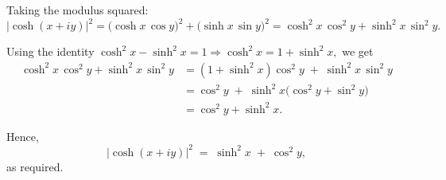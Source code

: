 \documentclass[12pt]{article}
\theoremstyle{definition} %
\theoremstyle{plain} %
\begin{document}
Taking the modulus squared:
\[
|\cosh(x + i y)|^2 
= \bigl(\cosh x \,\cos y\bigr)^2 + \bigl(\sinh x \,\sin y\bigr)^2 
= \cosh^2 x\,\cos^2 y + \sinh^2 x\,\sin^2 y.
\]

Using the identity \(\cosh^2 x - \sinh^2 x = 1 \Rightarrow \cosh^2 x = 1 + \sinh^2 x,\) we get
\begin{align*}
\cosh^2 x\,\cos^2 y + \sinh^2 x\,\sin^2 y
&= (1 + \sinh^2 x)\cos^2 y \;+\; \sinh^2 x\,\sin^2 y \\[4pt]
&= \cos^2 y \;+\; \sinh^2 x \bigl(\cos^2 y + \sin^2 y\bigr) \\[4pt]
&= \cos^2 y + \sinh^2 x.
\end{align*}

Hence,
\[
|\cosh(x + i y)|^2 
\;=\; \sinh^2 x \;+\; \cos^2 y,
\]
as required.
\end{document}
